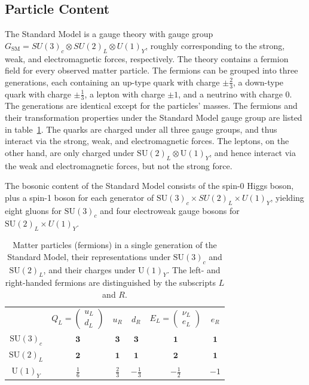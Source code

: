 \subsection{Particle Content}
The Standard Model is a gauge theory with gauge group $G_{\mathrm{SM}}=SU(3)_c\otimes SU(2)_L \otimes U(1)_Y$, roughly corresponding to the strong, weak, and electromagnetic forces, respectively. The theory contains a fermion field for every observed matter particle. The fermions can be grouped into three generations, each containing an up-type quark with charge $\pm\frac23$, a down-type quark with charge $\pm\frac13$, a lepton with charge $\pm1$, and a neutrino with charge $0$. The generations are identical except for the particles' masses. The fermions and their transformation properties under the Standard Model gauge group are listed in table~\ref{table:standard-model-particles}. The quarks are charged under all three gauge groups, and thus interact via the strong, weak, and electromagnetic forces. The leptons, on the other hand, are only charged under $\mathrm{SU}(2)_L\otimes \mathrm{U}(1)_Y$, and hence interact via the weak and electromagnetic forces, but not the strong force. 

The bosonic content of the Standard Model consists of the spin-0 Higgs boson, plus a spin-1 boson for each generator of $\mathrm{SU}(3)_c\times SU(2)_L \times U(1)_Y$, yielding eight gluons for $\mathrm{SU}(3)_c$ and four electroweak gauge bosons for $\mathrm{SU}(2)_L\times U(1)_Y$. 


\begin{table}[htbp]
	\centering
	\begin{tabular}{cccccc}
		 & $Q_L=\left(\begin{array}{c} u_L \\ d_L \end{array}\right)$ & $u_R$ & $d_R$ & $E_L=\left(\begin{array}{c} \nu_L \\ e_L \end{array}\right) $ & $e_R$ \\
		$\mathrm{SU}(3)_c$ & $\mathbf{3}$ &  $\mathbf{3}$ & $\mathbf{3}$ & $\mathbf{1}$ & $\mathbf{1}$ \\
		$\mathrm{SU}(2)_L$ & $\mathbf{2}$ & $\mathbf{1}$ & $\mathbf{1}$ & $\mathbf{2}$ & $\mathbf{1}$ \\
		$\mathrm{U}(1)_Y$ & $\frac16$ & $\frac23$ & $-\frac13$ & $-\frac12$ & $-1$ \\
	\end{tabular}
	\caption{Matter particles (fermions) in a single generation of the Standard Model, their representations under $\mathrm{SU}(3)_c$ and $\mathrm{SU}(2)_L$, and their charges under $\mathrm{U}(1)_Y$. The left- and right-handed fermions are distinguished by the subscripts $L$ and $R$.}
	\label{table:standard-model-particles}
\end{table}


